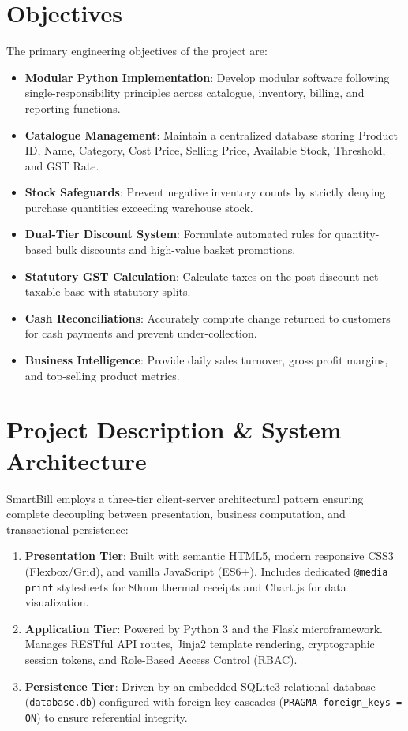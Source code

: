 \documentclass[12pt,a4paper]{article}
\begin{document}
\section{Objectives}
The primary engineering objectives of the project are:
\begin{itemize}
    \item \textbf{Modular Python Implementation}: Develop modular software following single-responsibility principles across catalogue, inventory, billing, and reporting functions.
    \item \textbf{Catalogue Management}: Maintain a centralized database storing Product ID, Name, Category, Cost Price, Selling Price, Available Stock, Threshold, and GST Rate.
    \item \textbf{Stock Safeguards}: Prevent negative inventory counts by strictly denying purchase quantities exceeding warehouse stock.
    \item \textbf{Dual-Tier Discount System}: Formulate automated rules for quantity-based bulk discounts and high-value basket promotions.
    \item \textbf{Statutory GST Calculation}: Calculate taxes on the post-discount net taxable base with statutory splits.
    \item \textbf{Cash Reconciliations}: Accurately compute change returned to customers for cash payments and prevent under-collection.
    \item \textbf{Business Intelligence}: Provide daily sales turnover, gross profit margins, and top-selling product metrics.
\end{itemize}

\section{Project Description \& System Architecture}
SmartBill employs a three-tier client-server architectural pattern ensuring complete decoupling between presentation, business computation, and transactional persistence:

\begin{enumerate}
    \item \textbf{Presentation Tier}: Built with semantic HTML5, modern responsive CSS3 (Flexbox/Grid), and vanilla JavaScript (ES6+). Includes dedicated \texttt{@media print} stylesheets for 80mm thermal receipts and Chart.js for data visualization.
    \item \textbf{Application Tier}: Powered by Python 3 and the Flask microframework. Manages RESTful API routes, Jinja2 template rendering, cryptographic session tokens, and Role-Based Access Control (RBAC).
    \item \textbf{Persistence Tier}: Driven by an embedded SQLite3 relational database (\texttt{database.db}) configured with foreign key cascades (\texttt{PRAGMA foreign\_keys = ON}) to ensure referential integrity.
\end{enumerate}
\end{document}
